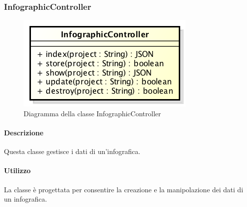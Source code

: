 \newpage
\subsubsection{InfographicController}
\begin{figure}[h]
\centering
\includegraphics[width=0.5\linewidth]{img/back_end_http_controllers_infographicController}
\caption[Diagramma della classe InfographicController]{Diagramma della classe InfographicController}
\label{fig:back_end_http_controllers_infographicController}
\end{figure}

	\paragraph{Descrizione}
		Questa classe gestisce i dati di un'infografica.
	\paragraph{Utilizzo}
		La classe è progettata per consentire la creazione e la manipolazione dei dati di un infografica.
		
